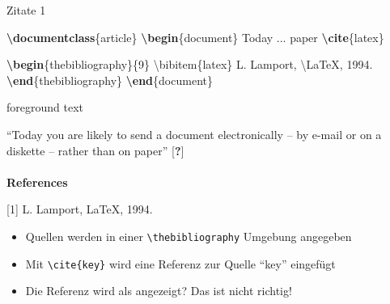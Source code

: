 \documentclass[aspectratio=169]{beamer}
\providecommand{\tightlist}{\setlength{\itemsep}{0pt}\setlength{\parskip}{0pt}}
\newenvironment{Shaded}{\begin{snugshade}}{\end{snugshade}}
\newcommand{\BuiltInTok}[1]{\textcolor[rgb]{0.25,0.67,0.19}{\textbf{#1}}}
\newcommand{\ExtensionTok}[1]{\textcolor[rgb]{0.25,0.67,0.19}{#1}}
\newcommand{\FunctionTok}[1]{\textcolor[rgb]{0.34,0.51,0.35}{#1}}
\newcommand{\KeywordTok}[1]{\textcolor[rgb]{0.25,0.67,0.19}{\textbf{#1}}}
\newcommand{\NormalTok}[1]{\textcolor[rgb]{0.19,0.19,0.19}{#1}}
\newenvironment{Shaded}{}{}
\newcommand\citestyle[1]{\textcolor{foreground-secondary}{\textsuperscript{#1}}}
\let\oldautocite\autocite
\renewcommand{\autocite}[1]{\citestyle{\oldautocite{#1}}}
\begin{document}
    \begin{frame}[fragile]{Zitate 1}
    \protect\hypertarget{zitate-1}{}
    \begin{minipage}{0.66\textwidth}

\begin{Shaded}
\begin{Highlighting}[]
\BuiltInTok{\textbackslash{}documentclass}\NormalTok{\{}\ExtensionTok{article}\NormalTok{\}}
\KeywordTok{\textbackslash{}begin}\NormalTok{\{}\ExtensionTok{document}\NormalTok{\}}
\NormalTok{\textasciigrave{}\textasciigrave{}Today ... paper\textquotesingle{}\textquotesingle{} }\KeywordTok{\textbackslash{}cite}\NormalTok{\{}\ExtensionTok{latex}\NormalTok{\}}

\KeywordTok{\textbackslash{}begin}\NormalTok{\{}\ExtensionTok{thebibliography}\NormalTok{\}\{9\}}
    \FunctionTok{\textbackslash{}bibitem}\NormalTok{\{latex\} }
\NormalTok{    L. Lamport, }\FunctionTok{\textbackslash{}LaTeX}\NormalTok{, 1994.}
\KeywordTok{\textbackslash{}end}\NormalTok{\{}\ExtensionTok{thebibliography}\NormalTok{\}}
\KeywordTok{\textbackslash{}end}\NormalTok{\{}\ExtensionTok{document}\NormalTok{\}}
\end{Highlighting}
\end{Shaded}

    \end{minipage}\begin{minipage}{0.33\textwidth}

    \bgroup 
        \begin{OutputBox}
        \begin{beamercolorbox}{foreground text}
            \selectfont%

    ``Today you are likely to send a 
    document electronically -- by e-mail 
    or on a diskette -- 
    rather than on paper'' [\textbf{?}]
    \\ \\
    \textbf{\Large References}

    [1] L. Lamport, \LaTeX, 1994.

            \end{beamercolorbox}
        \end{OutputBox}
    \egroup

    \end{minipage}

    \begin{itemize}
    \tightlist
    \item
      Quellen werden in einer \texttt{\textbackslash{}thebibliography}
      Umgebung angegeben \autocite{overleaf-bibtex}
    \item
      Mit \texttt{\textbackslash{}cite\{key\}} wird eine Referenz zur
      Quelle \enquote{key} eingefügt \autocite{overleaf-bibtex}
    \item
      Die Referenz wird als
      \mbox{\selectfont[\textbf{?}]} angezeigt? Das ist
      nicht richtig!
    \end{itemize}


\end{frame}
\end{document}
